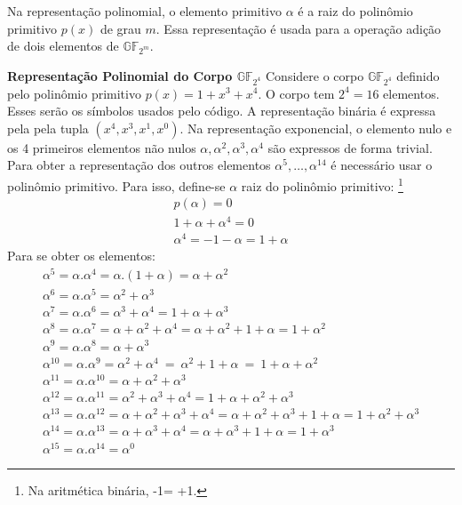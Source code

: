 Na representação polinomial, o elemento primitivo $\alpha$ é a raiz do polinômio primitivo $p(x)$ de grau $m$. Essa representação é usada para a operação adição de dois elementos de $\mathbb{GF}_{2^m}$.

\begin{example} {\bf Representação Polinomial do Corpo $\mathbb{GF}_{2^4}$} \label{RepPolCorpo} 
Considere o corpo $\mathbb{GF}_{2^4}$ definido pelo polinômio primitivo $p(x)=1 + x^3 + x^4$.  O corpo tem $2^4=16$ elementos. Esses serão os símbolos usados pelo código. A representação binária é expressa pela pela tupla $(x^4, x^3, x^1, x^0)$. Na representação exponencial, o elemento nulo e os 4 primeiros elementos não nulos $\alpha, \alpha^2, \alpha^3, \alpha^4$ são expressos de forma trivial. Para obter a representação dos outros elementos $\alpha^5, \ldots , \alpha^{14}$ é necessário usar o polinômio primitivo. Para isso, define-se $\alpha$ raiz do polinômio primitivo: \footnote{Na aritmética binária, -1= +1.}
\begin{align*}
p(\alpha) = 0\\
1 + \alpha + \alpha^4 = 0\\
\alpha^4 = -1-\alpha = 1+\alpha
\end{align*}
Para se obter os elementos:
\begin{align*}
\alpha^5 = \alpha.\alpha^4 = \alpha.(1+ \alpha) = \alpha + \alpha^2\\
\alpha^6 = \alpha.\alpha^5 = \alpha^2 + \alpha^3\\
\alpha^7 = \alpha.\alpha^6 = \alpha^3 + \alpha^4 = 1 + \alpha + \alpha^3\\
\alpha^8 = \alpha.\alpha^7 = \alpha + \alpha^2 + \alpha^4  = \alpha + \alpha^2 + 1 + \alpha = 1 + \alpha^2\\
\alpha^9 = \alpha.\alpha^8 = \alpha + \alpha^3\\
\alpha^{10} = \alpha.\alpha^9 = \alpha^2 + \alpha^4\ =\ \alpha^2 + 1 + \alpha\ =\ 1 + \alpha + \alpha^2\\
\alpha^{11} = \alpha.\alpha^{10} = \alpha + \alpha^2 + \alpha^3\\
\alpha^{12} = \alpha.\alpha^{11} = \alpha^2 + \alpha^3 + \alpha^4 = 1 + \alpha + \alpha^2 + \alpha ^3\\
\alpha^{13} = \alpha.\alpha^{12} = \alpha + \alpha^2 + \alpha^3 + \alpha^4 = \alpha + \alpha^2 + \alpha^3 + 1 + \alpha = 1 + \alpha^2 + \alpha^3\\
\alpha^{14} = \alpha.\alpha^{13} = \alpha + \alpha^3 + \alpha^4 = \alpha + \alpha^3 + 1 + \alpha = 1 + \alpha^3\\
\alpha^{15} = \alpha.\alpha^{14} = \alpha^0
\end{align*}



\end{example}

